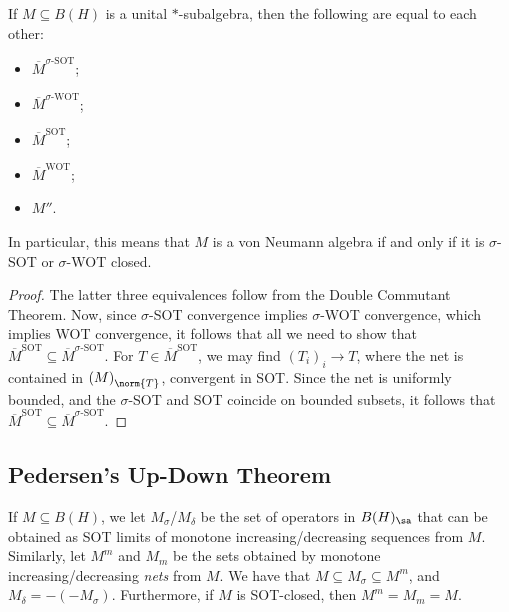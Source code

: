 \documentclass[10pt]{mypackage}
\begin{document}
\begin{corollary}
  If $M\subseteq B(H)$ is a unital $\ast$-subalgebra, then the following are equal to each other:
  \begin{itemize}
    \item $ \overline{M}^{\text{$\sigma$-SOT}} $;
    \item $ \overline{M}^{\text{$\sigma$-WOT}} $;
    \item $ \overline{M}^{\text{SOT}} $;
    \item $ \overline{M}^{\text{WOT}} $;
    \item $ M'' $.
  \end{itemize}
  In particular, this means that $M$ is a von Neumann algebra if and only if it is $\sigma$-SOT or $\sigma$-WOT closed.
\end{corollary}
\begin{proof}
  The latter three equivalences follow from the Double Commutant Theorem. Now, since $\sigma$-SOT convergence implies $\sigma$-WOT convergence, which implies WOT convergence, it follows that all we need to show that $ \overline{M}^{\text{SOT}}\subseteq \overline{M}^{\text{$\sigma$-SOT}} $. For $T\in \overline{M}^{\text{SOT}}$, we may find $\left( T_i \right)_i\rightarrow T$, where the net is contained in $\left( M \right)_{\norm{T}}$, convergent in SOT. Since the net is uniformly bounded, and the $\sigma$-SOT and SOT coincide on bounded subsets, it follows that $ \overline{M}^{\text{SOT}}\subseteq \overline{M}^{\text{$\sigma$-SOT}} $.
\end{proof}
\subsection{Pedersen's Up-Down Theorem}%
If $M\subseteq B(H)$, we let $M_{\sigma}$/$M_{\delta}$ be the set of operators in $B(H)_{\sa}$ that can be obtained as SOT limits of monotone increasing/decreasing sequences from $M$. Similarly, let $M^{m}$ and $M_{m}$ be the sets obtained by monotone increasing/decreasing \textit{nets} from $M$. We have that $M\subseteq M_{\sigma}\subseteq M^{m}$, and $M_{\delta} = -\left( -M_{\sigma} \right)$. Furthermore, if $M$ is SOT-closed, then $M^{m} = M_{m} = M$.
\end{document}
